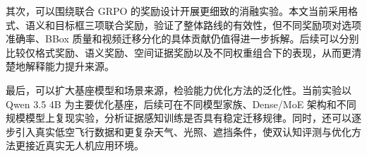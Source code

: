 其次，可以围绕联合 GRPO 的奖励设计开展更细致的消融实验。本文当前采用格式、语义和目标框三项联合奖励，验证了整体路线的有效性，但不同奖励项对选项准确率、BBox 质量和视频迁移分化的具体贡献仍值得进一步拆解。后续可以分别比较仅格式奖励、语义奖励、空间证据奖励以及不同权重组合下的表现，从而更清楚地解释能力提升来源。

最后，可以扩大基座模型和场景来源，检验能力优化方法的泛化性。当前实验以 Qwen 3.5 4B 为主要优化基座，后续可在不同模型家族、Dense/MoE 架构和不同规模模型上复现实验，分析证据感知训练是否具有稳定迁移规律。同时，还可以逐步引入真实低空飞行数据和更复杂天气、光照、遮挡条件，使双认知评测与优化方法更接近真实无人机应用环境。

